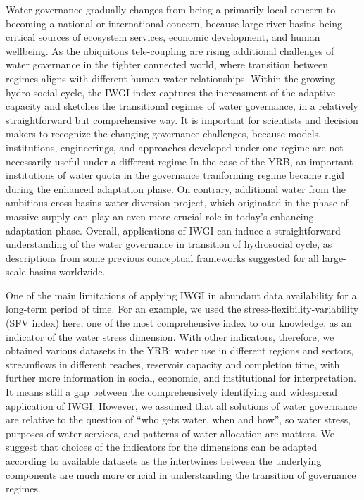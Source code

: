 Water governance gradually changes from being a primarily local concern to becoming a national or international concern, because large river basins being critical sources of ecosystem services, economic development, and human wellbeing. 
As the ubiquitous tele-coupling are rising additional challenges of water governance in the tighter connected world, where transition between regimes aligns with different human-water relationships. 
Within the growing hydro-social cycle, the IWGI index captures the increasment of the adaptive capacity and sketches the transitional regimes of water governance, in a relatively straightforward but comprehensive way.
It is important for scientists and decision makers to recognize the changing governance challenges, because models, institutions, engineerings, and approaches developed under one regime are not necessarily useful under a different regime
In the case of the YRB, an important institutions of water quota in the governance tranforming regime became rigid during the enhanced adaptation phase.
On contrary, additional water from the ambitious cross-basins water diversion project, which originated in the phase of massive supply can play an even more crucial role in today's enhancing adaptation phase.
Overall, applications of IWGI can induce a straightforward understanding of the water governance in transition of hydrosocial cycle, as descriptions from some previous conceptual frameworks suggested for all large-scale basins worldwide.

One of the main limitations of applying IWGI in abundant data availability for a long-term period of time. 
For an example, we used the stress-flexibility-variability (SFV index) here, one of the most comprehensive index to our knowledge, as an indicator of the water stress dimension. 
With other indicators, therefore, we obtained various datasets in the YRB: water use in different regions and sectors, streamflows in different reaches, reservoir capacity and completion time, with further more information in social, economic, and institutional for interpretation.
It means still a gap between the comprehensively identifying and widespread application of IWGI.
However, we assumed that all solutions of water governance are relative to the question of ``who gets water, when and how'', so water stress, purposes of water services, and patterns of water allocation are matters.
We suggest that choices of the indicators for the dimensions can be adapted according to available datasets as the intertwines between the underlying components are much more crucial in understanding the transition of governance regimes.

